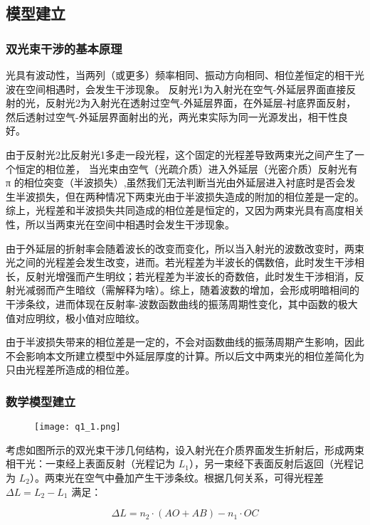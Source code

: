 \documentclass{cumcmthesis}
\begin{document}
\subsection{模型建立}
\subsubsection{双光束干涉的基本原理}
光具有波动性，当两列（或更多）频率相同、振动方向相同、相位差恒定的相干光波在空间相遇时，会发生干涉现象。
反射光1为入射光在空气-外延层界面直接反射的光，反射光2为入射光在透射过空气-外延层界面，在外延层-衬底界面反射，然后透射过空气-外延层界面射出的光，两光束实际为同一光源发出，相干性良好。

由于反射光2比反射光1多走一段光程，这个固定的光程差导致两束光之间产生了一个恒定的相位差， 
当光束由空气（光疏介质）进入外延层（光密介质）反射光有 π 的相位突变（半波损失）,虽然我们无法判断当光由外延层进入衬底时是否会发生半波损失，但在两种情况下两束光由于半波损失造成的附加的相位差是一定的。综上，光程差和半波损失共同造成的相位差是恒定的，又因为两束光具有高度相关性，所以当两束光在空间中相遇时会发生干涉现象。

由于外延层的折射率会随着波长的改变而变化，所以当入射光的波数改变时，两束光之间的光程差会发生改变，进而。若光程差为半波长的偶数倍，此时发生干涉相长，反射光增强而产生明纹；若光程差为半波长的奇数倍，此时发生干涉相消，反射光减弱而产生暗纹（需解释为啥）。综上，随着波数的增加，会形成明暗相间的干涉条纹，进而体现在反射率-波数函数曲线的振荡周期性变化，其中函数的极大值对应明纹，极小值对应暗纹。

由于半波损失带来的相位差是一定的，不会对函数曲线的振荡周期产生影响，因此不会影响本文所建立模型中外延层厚度的计算。所以后文中两束光的相位差简化为只由光程差所造成的相位差。
\subsubsection{数学模型建立}
\begin{figure}[H]
	\centering
	\texttt{[image: q1\_1.png]}
	\caption{}
	\label{fig:q1_1}
	\end{figure}
考虑如图所示的双光束干涉几何结构，设入射光在介质界面发生折射后，形成两束相干光：一束经上表面反射（光程记为 $L_1$），另一束经下表面反射后返回（光程记为 $L_2$）。两束光在空气中叠加产生干涉条纹。根据几何关系，可得光程差 $\Delta L = L_2 - L_1$ 满足：

\begin{equation}
\Delta L = n_2 \cdot (AO + AB) - n_1 \cdot OC 
\end{equation}
\end{document}
